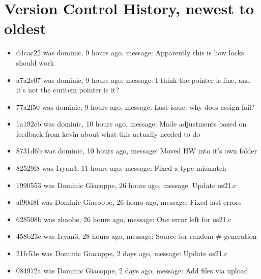 \documentclass[IEEEtran,letterpaper,10pt,notitlepage,draftclsnofoot,onecolumn]{article}
\begin{document}
\section{Version Control History, newest to oldest}
\begin{itemize}
\item d4cac22 was dominic, 9 hours ago, message: Apparently this is how locks should work
\item a7a2c07 was dominic, 9 hours ago, message: I think the pointer is fine, and it's not the curitem pointer is it?
\item 77a2f50 was dominic, 9 hours ago, message: Last issue: why does assign fail?
\item 1a192cb was dominic, 10 hours ago, message: Made adjustments based on feedback from kevin about what this actually needed to do
\item 8731d6b was dominic, 10 hours ago, message: Moved HW into it's own folder
\item 82529f8 was 1ryan3, 11 hours ago, message: Fixed a type mismatch
\item 1990553 was Dominic Giacoppe, 26 hours ago, message: Update os21.c
\item af90d8f was Dominic Giacoppe, 26 hours ago, message: Fixed last errors
\item 628508b was zhaobe, 26 hours ago, message: One error left for os21.c
\item 458b23c was 1ryan3, 28 hours ago, message: Source for random \# generation
\item 21fc53e was Dominic Giacoppe, 2 days ago, message: Update os21.c
\item 084972a was Dominic Giacoppe, 2 days ago, message: Add files via upload
\end{itemize}
\end{document}
